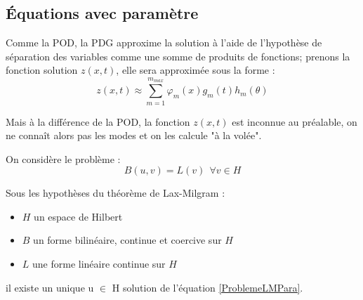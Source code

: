 \documentclass[12pt,a4paper]{report}
\begin{document}
%
%
%


\subsection{Équations avec paramètre}
Comme la POD, la PDG approxime la solution à l'aide de l'hypothèse de séparation des variables comme une somme de produits de fonctions; prenons la fonction solution $ z(x,t)$, elle sera approximée sous la forme :
\begin{equation}
z(x,t) \approx \sum^{m_{max}}_{m=1} \varphi_m(x) g_m(t) h_m(\theta)
\end{equation}

Mais à la différence de la POD, la fonction $z(x,t)$ est inconnue au préalable, on ne connaît alors pas les modes et on les calcule "à la volée".

On considère le problème :
\begin{equation}
\label{ProblemeLMPara}
B(u,v) = L(v) ~~ \forall v \in H
\end{equation}

\noindent
Sous les hypothèses du théorème de Lax-Milgram :
\begin{itemize}
\item $H$ un espace de Hilbert
\item $B$ un forme bilinéaire, continue et coercive sur $H$
\item $L$ une forme linéaire continue sur $H$
\end{itemize}
il existe un unique u $\in$ H solution de l'équation \ref{ProblemeLMPara}.
\end{document}
